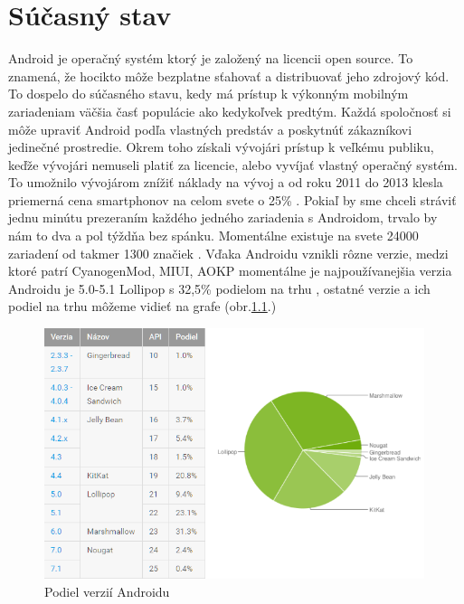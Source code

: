 \chapter{Súčasný stav}

Android je operačný systém ktorý je založený na licencii open source\cite{android}. To znamená, že hocikto môže bezplatne sťahovať a distribuovať jeho zdrojový kód. To dospelo do súčasného stavu, kedy má prístup k výkonným mobilným zariadeniam väčšia časť populácie ako kedykoľvek predtým. Každá spoločnosť si môže upraviť Android podľa vlastných predstáv a poskytnúť zákazníkovi jedinečné prostredie. Okrem toho získali vývojári prístup k veľkému publiku, keďže vývojári nemuseli platiť za licencie, alebo vyvíjať vlastný operačný systém. To umožnilo vývojárom znížiť náklady na vývoj a od roku 2011 do 2013 klesla priemerná cena smartphonov na celom svete o 25\% \cite{cena_smartphone}. Pokiaľ by sme chceli stráviť jednu minútu prezeraním každého jedného zariadenia s Androidom, trvalo by nám to dva a pol týždňa bez spánku. Momentálne existuje na svete 24000 zariadení od takmer 1300 značiek \cite{pocetTelefonov}. Vďaka Androidu vznikli rôzne verzie, medzi ktoré patrí CyanogenMod, MIUI, AOKP momentálne je najpoužívanejšia verzia Androidu je 5.0-5.1 Lollipop s 32,5\% podielom na trhu \cite{usage}, ostatné verzie a ich podiel na trhu môžeme vidieť na grafe (obr.\ref{obr1.1}.)

\begin{figure}[ht]
    \begin{center}
        \begin{minipage}{0.99\linewidth}
            \begin{center}
                \includegraphics[width=0.99\textwidth]{images/verzie_and.png}
                \caption{Podiel verzií Androidu}
                \label{obr1.1}
            \end{center}
        \end{minipage}
    \end{center}
\end{figure}
 

